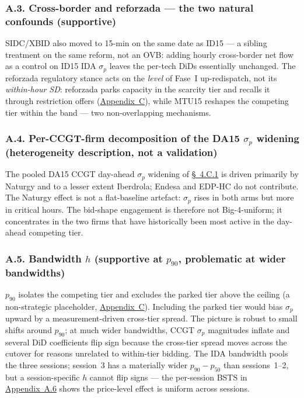 \documentclass[11pt]{article}
\begin{document}
\subsubsection*{A.3. Cross-border and reforzada --- the two natural confounds \textnormal{(supportive)}}\label{sec:5c}\label{sec:5d}
SIDC/XBID also moved to 15-min on the same date as ID15 --- a sibling treatment on the same reform, not an OVB: adding hourly cross-border net flow as a control on ID15 IDA $\sigma_p$ leaves the per-tech DiDs essentially unchanged. The reforzada regulatory stance acts on the \emph{level} of Fase~I up-redispatch, not its \emph{within-hour SD}: reforzada parks capacity in the scarcity tier and recalls it through restriction offers (\hyperref[sec:context]{Appendix~C}), while MTU15 reshapes the competing tier within the band --- two non-overlapping mechanisms.

\subsubsection*{A.4. Per-CCGT-firm decomposition of the DA15 $\sigma_p$ widening \textnormal{(heterogeneity description, not a validation)}}
The pooled DA15 CCGT day-ahead $\sigma_p$ widening of \hyperref[sec:4i]{\S~4.C.1} is driven primarily by Naturgy and to a lesser extent Iberdrola; Endesa and EDP-HC do not contribute. The Naturgy effect is not a flat-baseline artefact: $\sigma_p$ rises in both arms but more in critical hours. The bid-shape engagement is therefore not Big-4-uniform; it concentrates in the two firms that have historically been most active in the day-ahead competing tier.

\subsubsection*{A.5. Bandwidth $h$ \textnormal{(supportive at $p_{90}$, problematic at wider bandwidths)}}\label{sec:5e}
$p_{90}$ isolates the competing tier and excludes the parked tier above the ceiling (a non-strategic placeholder, \hyperref[sec:context]{Appendix~C}). Including the parked tier would bias $\sigma_p$ upward by a measurement-driven cross-tier spread. The picture is robust to small shifts around $p_{90}$; at much wider bandwidths, CCGT $\sigma_p$ magnitudes inflate and several DiD coefficients flip sign because the cross-tier spread moves across the cutover for reasons unrelated to within-tier bidding. The IDA bandwidth pools the three sessions; session~3 has a materially wider $p_{90}-p_{50}$ than sessions~1--2, but a session-specific $h$ cannot flip signs --- the per-session BSTS in \hyperref[sec:5f]{Appendix~A.6} shows the price-level effect is uniform across sessions.
\end{document}
